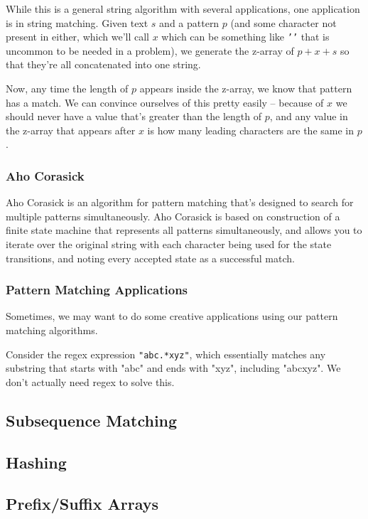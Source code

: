 While this is a general string algorithm with several applications, one application is in string matching. Given text $s$ and a pattern $p$ (and some character not present in either, which we'll call $x$ which can be something like \texttt{'\n'} that is uncommon to be needed in a problem), we generate the z-array of $p+x+s$ so that they're all concatenated into one string.

Now, any time the length of $p$ appears inside the z-array, we know that pattern has a match. We can convince ourselves of this pretty easily -- because of $x$ we should never have a value that's greater than the length of $p$, and any value in the z-array that appears after $x$ is how many leading characters are the same in $p$.

\subsubsection{Aho Corasick}

Aho Corasick is an algorithm for pattern matching that's designed to search for multiple patterns simultaneously. Aho Corasick is based on construction of a finite state machine that represents all patterns simultaneously, and allows you to iterate over the original string with each character being used for the state transitions, and noting every accepted state as a successful match.

\subsubsection{Pattern Matching Applications}

Sometimes, we may want to do some creative applications using our pattern matching algorithms.

Consider the regex expression \texttt{"abc.*xyz"}, which essentially matches any substring that starts with "abc" and ends with "xyz", including "abcxyz". We don't actually need regex to solve this.

\subsection{Subsequence Matching}
\subsection{Hashing}
\subsection{Prefix/Suffix Arrays}
